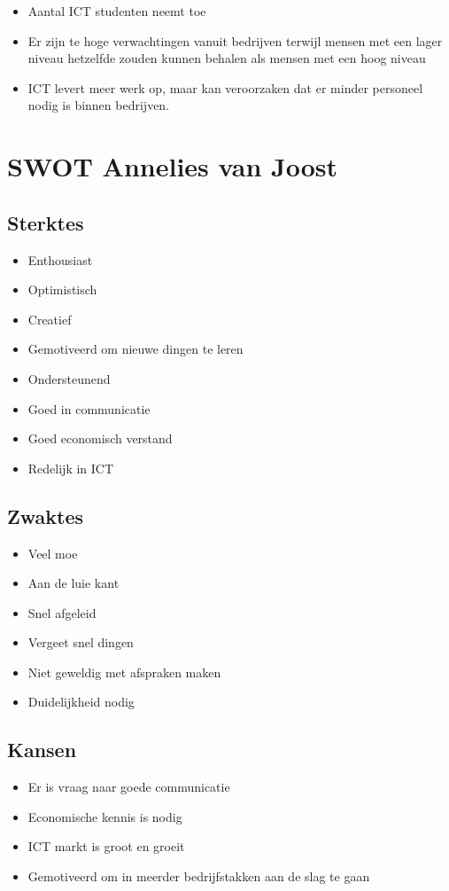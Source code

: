 \begin{itemize}
\item
  Aantal ICT studenten neemt toe
\item
  Er zijn te hoge verwachtingen vanuit bedrijven
  terwijl mensen met een lager niveau hetzelfde zouden kunnen behalen
  als mensen met een hoog niveau
\item
  ICT levert meer werk op,
  maar kan veroorzaken dat er minder personeel nodig is binnen bedrijven.
\end{itemize}

\section{SWOT Annelies van Joost}

\subsection{Sterktes}
\begin{itemize}
\item Enthousiast
\item Optimistisch
\item Creatief
\item Gemotiveerd om nieuwe dingen te leren
\item Ondersteunend
\item Goed in communicatie
\item Goed economisch verstand
\item Redelijk in ICT
\end{itemize}

\subsection{Zwaktes}
\begin{itemize}  
\item Veel moe
\item Aan de luie kant
\item Snel afgeleid
\item Vergeet snel dingen
\item Niet geweldig met afspraken maken
\item Duidelijkheid nodig
\end{itemize}

\subsection{Kansen}
\begin{itemize}
\item Er is vraag naar goede communicatie
\item Economische kennis is nodig
\item ICT markt is groot en groeit
\item Gemotiveerd om in meerder bedrijfstakken aan de slag te gaan
\end{itemize}

